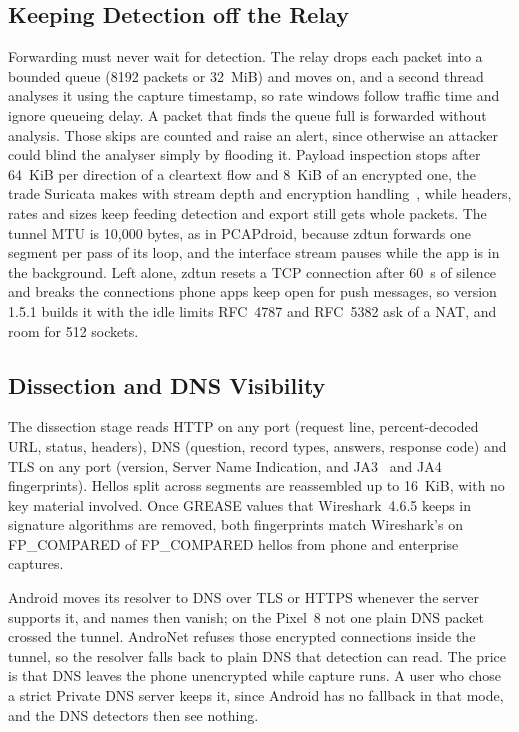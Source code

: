\documentclass[runningheads]{llncs}
\begin{document}
\subsection{Keeping Detection off the Relay}\label{sec:relay}

Forwarding must never wait for detection. The relay drops each packet into a bounded queue (8192 packets or 32~MiB) and moves on, and a second thread analyses it using the capture timestamp, so rate windows follow traffic time and ignore queueing delay. A packet that finds the queue full is forwarded without analysis. Those skips are counted and raise an alert, since otherwise an attacker could blind the analyser simply by flooding it. Payload inspection stops after 64~KiB per direction of a cleartext flow and 8~KiB of an encrypted one, the trade Suricata makes with stream depth and encryption handling~\cite{suricata}, while headers, rates and sizes keep feeding detection and export still gets whole packets. The tunnel MTU is 10,000 bytes, as in PCAPdroid, because zdtun forwards one segment per pass of its loop, and the interface stream pauses while the app is in the background. Left alone, zdtun resets a TCP connection after 60~s of silence and breaks the connections phone apps keep open for push messages, so version 1.5.1 builds it with the idle limits RFC~4787 and RFC~5382 ask of a NAT, and room for 512 sockets.

\subsection{Dissection and DNS Visibility}

The dissection stage reads HTTP on any port (request line, percent-decoded URL, status, headers), DNS (question, record types, answers, response code) and TLS on any port (version, Server Name Indication, and JA3~\cite{ja3} and JA4~\cite{ja4} fingerprints). Hellos split across segments are reassembled up to 16~KiB, with no key material involved. Once GREASE values that Wireshark~4.6.5 keeps in signature algorithms are removed, both fingerprints match Wireshark's on {{FP_COMPARED}} of {{FP_COMPARED}} hellos from phone and enterprise captures.

Android moves its resolver to DNS over TLS or HTTPS whenever the server supports it, and names then vanish; on the Pixel~8 not one plain DNS packet crossed the tunnel. AndroNet refuses those encrypted connections inside the tunnel, so the resolver falls back to plain DNS that detection can read. The price is that DNS leaves the phone unencrypted while capture runs. A user who chose a strict Private DNS server keeps it, since Android has no fallback in that mode, and the DNS detectors then see nothing.
\end{document}
